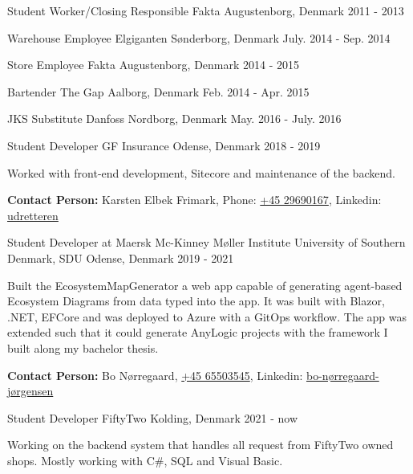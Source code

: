 \begin{cventries}
\cventry
{Student Worker/Closing Responsible} %
{Fakta} %
{Augustenborg, Denmark} %
{2011 - 2013} %
{}

\cventry
{Warehouse Employee} %
{Elgiganten} %
{Sønderborg, Denmark} %
{July. 2014 - Sep. 2014} %
{}

\cventry
{Store Employee} %
{Fakta} %
{Augustenborg, Denmark} %
{2014 - 2015} %
{}

\cventry
{Bartender} %
{The Gap} %
{Aalborg, Denmark} %
{Feb. 2014 -  Apr. 2015} %
{}

\cventry
{JKS Substitute} %
{Danfoss} %
{Nordborg, Denmark} %
{May. 2016 -  July. 2016} %
{}

\cventry
{Student Developer} %
{GF Insurance} %
{Odense, Denmark} %
{2018 -  2019} %
{
  \begin{cvitems}
    \item {Worked with front-end development, Sitecore and maintenance of the backend.}
    \item {\textbf{Contact Person:} Karsten Elbek Frimark, Phone: \href{tel:29690167}{+45 29690167}, Linkedin: \href{https://dk.linkedin.com/in/udretteren/}{udretteren}}
  \end{cvitems}
}

\cventry
{Student Developer at Maersk Mc-Kinney Møller Institute} %
{University of Southern Denmark, SDU} %
{Odense, Denmark} %
{2019 - 2021} %
{
  \begin{cvitems}
    \item {Built the EcosystemMapGenerator a web app capable of generating agent-based Ecosystem Diagrams from data typed into the app. It was built with Blazor, .NET, EFCore and was deployed to Azure with a GitOps workflow. The app was extended such that it could generate AnyLogic projects with the framework I built along my bachelor thesis.}
    \item {\textbf{Contact Person:} Bo Nørregaard, \href{tel:65503545}{+45 65503545}, Linkedin: \href{https://dk.linkedin.com/in/bo-nørregaard-jørgensen-1773201}{bo-nørregaard-jørgensen}}
  \end{cvitems}
}

\cventry
{Student Developer} %
{FiftyTwo} %
{Kolding, Denmark} %
{2021 - now} %
{
  \begin{cvitems}
    \item {Working on the backend system that handles all request from FiftyTwo owned shops. Mostly working with C\#, SQL and Visual Basic.}
  \end{cvitems}
}
\end{cventries}
